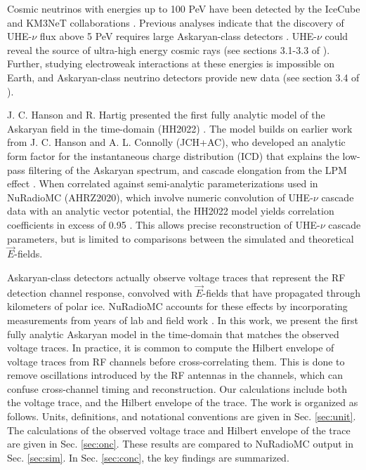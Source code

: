 \documentclass[amsmath,amssymb,aps,prd,10pt,twocolumn,showkeys]{revtex4}
\begin{document}
Cosmic neutrinos with energies up to 100 PeV have been detected by the IceCube and KM3NeT collaborations \cite{10.1126/science.1242856,aartsen2013first-bff,collaboration2016observation-03b,collaboration2018neutrino-2a0,collaboration2021detection-6fa,collaboration2022evidence-a08,collaboration2023observation-08b,collaboration2025observation-22f}. Previous analyses indicate that the discovery of UHE-$\nu$ flux above 5 PeV requires large Askaryan-class detectors \cite{10.1103/physrevd.98.062003}.  UHE-$\nu$ could reveal the source of ultra-high energy cosmic rays (see sections 3.1-3.3 of \cite{10.48550/arxiv.2008.04323}).  Further, studying electroweak interactions at these energies is impossible on Earth, and Askaryan-class neutrino detectors provide new data (see section 3.4 of \cite{10.48550/arxiv.2008.04323}).

J. C. Hanson and R. Hartig presented the first fully analytic model of the Askaryan field in the time-domain (HH2022) \cite{PhysRevD.105.123019}.  The model builds on earlier work from J. C. Hanson and A. L. Connolly (JCH+AC), who developed an analytic form factor for the instantaneous charge distribution (ICD) that explains the low-pass filtering of the Askaryan spectrum, and cascade elongation from the LPM effect \cite{10.1016/j.astropartphys.2017.03.008}.  When correlated against semi-analytic parameterizations used in NuRadioMC (AHRZ2020), which involve numeric convolution of UHE-$\nu$ cascade data with an analytic vector potential, the HH2022 model yields correlation coefficients in excess of 0.95 \cite{PhysRevD.101.083005,PhysRevD.105.123019}.  This allows precise reconstruction of UHE-$\nu$ cascade parameters, but is limited to comparisons between the simulated and theoretical $\vec{E}$-fields.

Askaryan-class detectors actually observe voltage traces that represent the RF detection channel response, convolved with $\vec{E}$-fields that have propagated through kilometers of polar ice.  NuRadioMC accounts for these effects by incorporating measurements from years of lab and field work \cite{10.1016/j.astropartphys.2014.09.002,10.3189/2015jog14j214,10.3189/2015jog15j057,saltzberg,10.1103/PhysRevD.74.043002,ask_ice,10.1140/epjc/s10052-020-7612-8,Barwick:2018497,ALLISON201963,10.1088/1748-0221/15/09/p09039,deaconu2018measurements-182,welling2024brief-b47}.  In this work, we present the first fully analytic Askaryan model in the time-domain that matches the observed voltage traces.  In practice, it is common to compute the Hilbert envelope of voltage traces from RF channels before cross-correlating them.  This is done to remove oscillations introduced by the RF antennas in the channels, which can confuse cross-channel timing and reconstruction.  Our calculations include both the voltage trace, and the Hilbert envelope of the trace.  The work is organized as follows.  Units, definitions, and notational conventions are given in Sec. \ref{sec:unit}.  The calculations of the observed voltage trace and Hilbert envelope of the trace are given in Sec. \ref{sec:onc}.  These results are compared to NuRadioMC output in Sec. \ref{sec:sim}.  In Sec. \ref{sec:conc}, the key findings are summarized.
\end{document}
